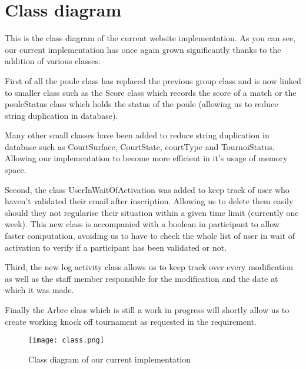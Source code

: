 \section{Class diagram}

This is the class diagram of the current website implementation. As you can see, our current implementation has once again grown significantly thanks to the addition of various classes. \newline

First of all the poule class has replaced the previous group class and is now linked to smaller class such as the Score class which records the score of a match or the pouleStatus class which holds the status of the poule (allowing us to reduce string duplication in database).\newline

Many other small classes have been added to reduce string duplication in database such as CourtSurface, CourtState, courtType and TournoiStatus. Allowing our implementation to become more efficient in it's usage of memory space.\newline

Second, the class UserInWaitOfActivation was added to keep track of user who haven't validated their email after inscription. Allowing us to delete them easily should they not regularise their situation within a given time limit (currently one week). This new class is accompanied with a boolean in participant to allow faster computation, avoiding us to have to check the whole list of user in wait of activation to verify if a participant has been validated or not.\newline

Third, the new log activity class allows us to keep track over every modification as well as the staff member responsible for the modification and the date at which it was made. \newline

Finally the Arbre class which is still a work in progress will shortly allow us to create working knock off tournament as requested in the requirement.\newline

\begin{figure}[!ht]
	\centering
	\texttt{[image: class.png]}
	\caption{Class diagram of our current implementation}
	\label{fig:length_eight_mouse}
\end{figure}
\FloatBarrier